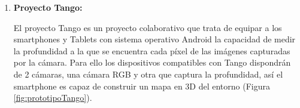 \begin {enumerate}
\item \textbf{Proyecto Tango:}

El proyecto Tango es un proyecto colaborativo que trata de equipar a los smartphones y Tablets con sistema operativo Android la capacidad de medir la profundidad a la que se encuentra cada píxel de las imágenes capturadas por la cámara. Para ello los dispositivos compatibles con Tango dispondrán de 2 cámaras, una cámara RGB y otra que captura la profundidad, así el smartphone es capaz de construir un mapa en 3D del entorno (Figura \ref{fig:prototipoTango}). 
\begin{figure}[htbp]
\begin{center}
\hspace{0.5cm}
\hspace{0.5cm}

\end{center}
\end{figure}
\end{enumerate}
